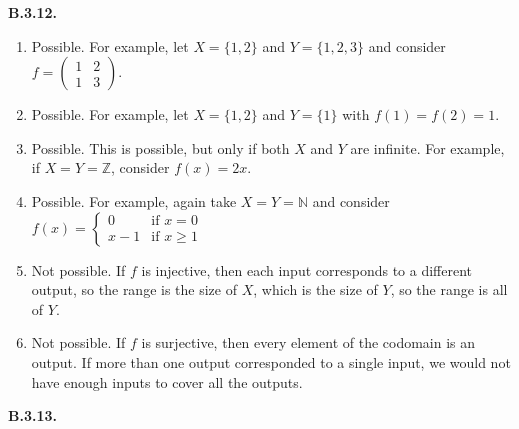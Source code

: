 \documentclass[10pt,]{book}
\theoremstyle{plain}
\theoremstyle{definition}
\theoremstyle{definition}
\theoremstyle{definition}
\theoremstyle{definition}
\numberwithin{equation}{chapter}
\def\N{\mathbb N}
\def\Z{\mathbb Z}
\newcommand{\amp}{&}
\begin{document}
%
\par\smallskip
\noindent\textbf{B.3.12.} \hypertarget{p-1749}{}%
\leavevmode%
\begin{enumerate}[label=(\alph*)]
\item\hypertarget{li-623}{}\hypertarget{p-1750}{}%
Possible. For example, let \(X=\{1,2\}\) and \(Y = \{1,2,3\}\) and consider \(f=\begin{pmatrix}1 \amp 2 \\ 1 \amp 3\end{pmatrix}\).%
\item\hypertarget{li-624}{}\hypertarget{p-1751}{}%
Possible. For example, let \(X = \{1,2\}\) and \(Y = \{1\}\) with \(f(1) = f(2) = 1\).%
\item\hypertarget{li-625}{}\hypertarget{p-1752}{}%
Possible. This is possible, but only if both \(X\) and \(Y\) are infinite. For example, if \(X = Y = \Z\), consider \(f(x) = 2x\).%
\item\hypertarget{li-626}{}\hypertarget{p-1753}{}%
Possible. For example, again take \(X = Y = \N\) and consider \(f(x) = \begin{cases} 0 \amp \text{if } x = 0 \\ x-1 \amp \text{if } x \ge 1\end{cases}\)%
\item\hypertarget{li-627}{}\hypertarget{p-1754}{}%
Not possible. If \(f\) is injective, then each input corresponds to a different output, so the range is the size of \(X\), which is the size of \(Y\), so the range is all of \(Y\).%
\item\hypertarget{li-628}{}\hypertarget{p-1755}{}%
Not possible. If \(f\) is surjective, then every element of the codomain is an output. If more than one output corresponded to a single input, we would not have enough inputs to cover all the outputs.%
\end{enumerate}
%
\par\smallskip
\noindent\textbf{B.3.13.} \hypertarget{p-1763}{}%
\leavevmode%
\end{document}
